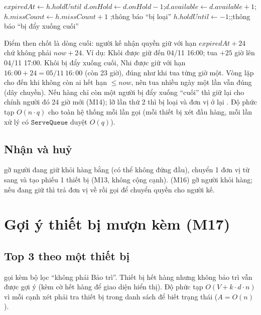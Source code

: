 \begin{algorithm}[H]
\caption{\textsc{ExpireReservations}$()$}
\begin{algorithmic}[1]
    \State $expiredAt \gets h.holdUntil$
    \State $d.onHold \gets d.onHold-1$;\quad $d.available \gets d.available+1$;\quad $h.missCount \gets h.missCount+1$
      \State {};\quad thông báo ``bị loại''
    \Else
      \State $h.holdUntil \gets -1$;\quad {};\quad thông báo ``bị đẩy xuống cuối''
    \EndIf
    \State {}
  \EndWhile
\EndFor
\end{algorithmic}
\end{algorithm}

Điểm then chốt là dòng cuối: người kế nhận quyền giữ với hạn $expiredAt + 24$ chứ không phải $now + 24$. Ví dụ: Khôi được giữ đến 04/11 16:00; tua $+25$ giờ lên 04/11 17:00. Khôi bị đẩy xuống cuối, Nhi được giữ với hạn $16{:}00 + 24 = 05/11\ 16{:}00$ (còn 23 giờ), đúng như khi tua từng giờ một. Vòng  lặp cho đến khi không còn ai hết hạn $\le now$, nên tua nhiều ngày một lần vẫn đúng (dây chuyền). Nếu hàng chỉ còn một người bị đẩy xuống ``cuối'' thì  giữ lại cho chính người đó 24 giờ mới (M14); lỡ lần thứ 2 thì bị loại và đơn vị ở lại . Độ phức tạp $O(n\cdot q)$ cho toàn hệ thống mỗi lần gọi (mỗi thiết bị xét đầu hàng, mỗi lần xử lý có $\texttt{ServeQueue}$ duyệt $O(q)$).

\subsection{Nhận và huỷ}
 gỡ người đang giữ khỏi hàng bằng  (có thể không đứng đầu), chuyển 1 đơn vị từ  sang  và tạo phiếu 1 thiết bị (M13, không cộng cạnh).  (M16) gỡ người khỏi hàng; nếu đang giữ thì trả đơn vị về  rồi gọi  để chuyển quyền cho người kế.

\section{Gợi ý thiết bị mượn kèm (M17)}
\subsection{Top 3 theo một thiết bị}
 gọi  kèm bộ lọc ``không phải Bảo trì''. Thiết bị hết hàng nhưng không bảo trì vẫn được gợi ý (kèm cờ hết hàng để giao diện hiển thị). Độ phức tạp $O(V + k\cdot d\cdot n)$ vì mỗi cạnh xét phải tra thiết bị trong danh sách để biết trạng thái ($A = O(n)$).


